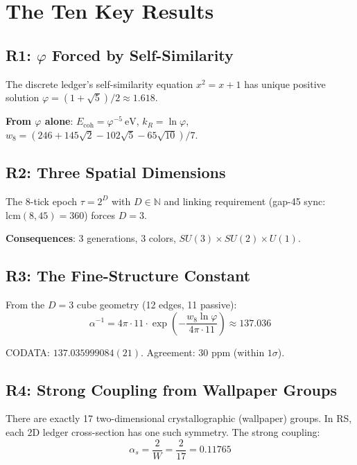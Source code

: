 \documentclass[12pt,twocolumn]{article}
\begin{document}
\section{The Ten Key Results}

\subsection{R1: $\varphi$ Forced by Self-Similarity}

The discrete ledger's self-similarity equation $x^2 = x + 1$ has unique positive 
solution $\varphi = (1+\sqrt{5})/2 \approx 1.618$.

\textbf{From $\varphi$ alone}: $E_\mathrm{coh} = \varphi^{-5}~\mathrm{eV}$, 
$k_R = \ln\varphi$, $w_8 = (246 + 145\sqrt{2} - 102\sqrt{5} - 65\sqrt{10})/7$.

\subsection{R2: Three Spatial Dimensions}

The 8-tick epoch $\tau = 2^D$ with $D \in \mathbb{N}$ and linking requirement 
(gap-45 sync: $\mathrm{lcm}(8, 45) = 360$) forces $D = 3$.

\textbf{Consequences}: 3 generations, 3 colors, $SU(3) \times SU(2) \times U(1)$.

\subsection{R3: The Fine-Structure Constant}

From the $D=3$ cube geometry (12 edges, 11 passive):
\begin{equation}
\alpha^{-1} = 4\pi \cdot 11 \cdot \exp\!\left(-\frac{w_8 \ln\varphi}{4\pi\cdot 11}\right)
\approx 137.036
\end{equation}

CODATA: $137.035999084(21)$. Agreement: $30$ ppm (within $1\sigma$).

\subsection{R4: Strong Coupling from Wallpaper Groups}

There are exactly 17 two-dimensional crystallographic (wallpaper) groups. 
In RS, each 2D ledger cross-section has one such symmetry. The strong coupling:
\begin{equation}
\alpha_s = \frac{2}{W} = \frac{2}{17} = 0.11765
\end{equation}
\end{document}
